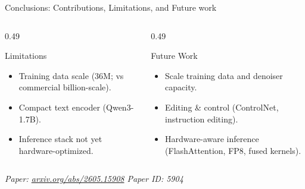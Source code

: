 \documentclass[aspectratio=169,10pt]{beamer}
\begin{document}
\begin{frame}{Conclusions: Contributions, Limitations, and Future work}
  \begin{columns}[T,onlytextwidth]
    \begin{column}{0.49\textwidth}
      \begin{block}{Limitations}
        \scriptsize
        \begin{itemize}[label=$\bullet$,leftmargin=1.2em,topsep=0pt,itemsep=2pt,parsep=0pt]
          \item Training data scale (36M; vs commercial billion-scale).
          \item Compact text encoder (Qwen3-1.7B).
          \item Inference stack not yet hardware-optimized.
        \end{itemize}
      \end{block}
    \end{column}
    \begin{column}{0.49\textwidth}
      \begin{block}{Future Work}
        \scriptsize
        \begin{itemize}[label=$\bullet$,leftmargin=1.2em,topsep=0pt,itemsep=2pt,parsep=0pt]
          \item Scale training data and denoiser capacity.
          \item Editing \& control (ControlNet, instruction editing).
          \item Hardware-aware inference (FlashAttention, FP8, fused kernels).
        \end{itemize}
      \end{block}
    \end{column}
  \end{columns}
  \vspace{0.3em}
  \begin{center}
    \scriptsize\color{rapdgray}\itshape Paper: \href{https://arxiv.org/abs/2605.15908}{arxiv.org/abs/2605.15908} \quad Paper ID: 5904
  \end{center}
\end{frame}

\end{document}
